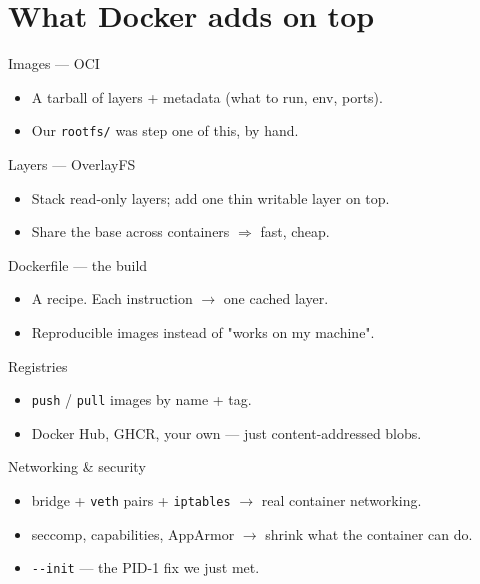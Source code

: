 \documentclass[10pt,aspectratio=169]{beamer}
\newcommand{\cmd}[1]{\texttt{\small #1}}
\begin{document}
\section{What Docker adds on top}

\begin{frame}{Images — OCI}
  \begin{itemize}
    \item A tarball of \alert{layers} + metadata (what to run, env, ports).
    \item Our \cmd{rootfs/} was step one of this, by hand.
  \end{itemize}
\end{frame}

\begin{frame}{Layers — OverlayFS}
  \begin{itemize}
    \item Stack read-only layers; add one thin \alert{writable} layer on top.
    \item Share the base across containers $\Rightarrow$ fast, cheap.
  \end{itemize}
\end{frame}

\begin{frame}{Dockerfile — the build}
  \begin{itemize}
    \item A recipe. Each instruction $\rightarrow$ one cached layer.
    \item Reproducible images instead of "works on my machine".
  \end{itemize}
\end{frame}

\begin{frame}{Registries}
  \begin{itemize}
    \item \cmd{push} / \cmd{pull} images by name + tag.
    \item Docker Hub, GHCR, your own — just content-addressed blobs.
  \end{itemize}
\end{frame}

\begin{frame}{Networking \& security}
  \begin{itemize}
    \item bridge + \cmd{veth} pairs + \cmd{iptables} $\rightarrow$ real container networking.
    \item seccomp, capabilities, AppArmor $\rightarrow$ shrink what the container can do.
    \item \alert{\texttt{-{}-init}} — the PID-1 fix we just met.
  \end{itemize}
\end{frame}
\end{document}
